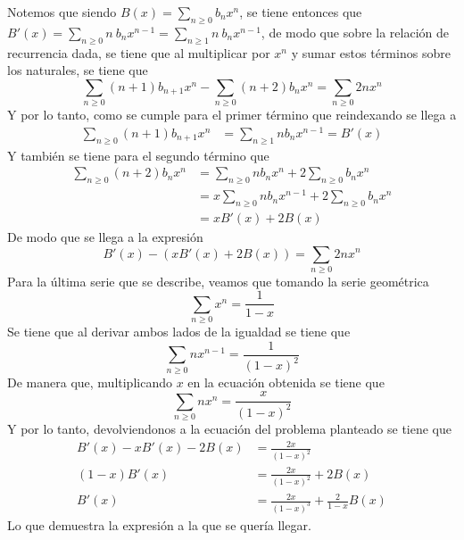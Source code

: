 \begin{solution}
    Notemos que siendo $B(x)=\sum_{n\geq 0}b_nx^n$, se tiene entonces que $B'(x)=\sum_{n\geq 0}n\ b_nx^{n-1}=\sum_{n\geq 1}n\ b_nx^{n-1}$, de modo que sobre la relación de recurrencia dada, se tiene que al multiplicar por $x^{n}$ y sumar estos términos sobre los naturales, se tiene que
    \begin{equation*}
        \sum_{n\geq 0}(n+1)b_{n+1}x^{n}-\sum_{n\geq 0}(n+2)b_{n}x^{n}=\sum_{n\geq 0}2nx^{n}
    \end{equation*}
    Y por lo tanto, como se cumple para el primer término que reindexando se llega a
    \begin{align*}
        \sum_{n\geq 0}(n+1)b_{n+1}x^{n}&=\sum_{n\geq 1}nb_{n}x^{n-1}=B'(x)
    \end{align*}
    Y también se tiene para el segundo término que
    \begin{align*}
        \sum_{n\geq 0}(n+2)b_{n}x^{n}&=\sum_{n\geq 0}nb_{n}x^{n}+2\sum_{n\geq 0}b_{n}x^{n}\\
        &=x\sum_{n\geq 0}nb_{n}x^{n-1}+2\sum_{n\geq 0}b_{n}x^{n}\\
        &=xB'(x) + 2B(x)
    \end{align*}
    De modo que se llega a la expresión
    \begin{equation*}
        B'(x)-(xB'(x) + 2B(x))=\sum_{n\geq 0}2nx^{n}
    \end{equation*}
    Para la última serie que se describe, veamos que tomando la serie geométrica
    \begin{equation*}
        \sum_{n\geq 0}x^n=\frac{1}{1-x}
    \end{equation*}
    Se tiene que al derivar ambos lados de la igualdad se tiene que
    \begin{equation*}
        \sum_{n\geq 0}nx^{n-1}=\frac{1}{(1-x)^2}
    \end{equation*}
    De manera que, multiplicando $x$ en la ecuación obtenida se tiene que
    \begin{equation*}
        \sum_{n\geq 0}nx^{n}=\frac{x}{(1-x)^2}
    \end{equation*}
    Y por lo tanto, devolviendonos a la ecuación del problema planteado se tiene que
    \begin{align*}
        B'(x)-xB'(x) - 2B(x)&=\frac{2x}{(1-x)^2}\\
        (1-x)B'(x)&=\frac{2x}{(1-x)^2} + 2B(x)\\
        B'(x)&=\frac{2x}{(1-x)^3}+\frac{2}{1-x}B(x)
    \end{align*}
    Lo que demuestra la expresión a la que se quería llegar. 

    
\end{solution}